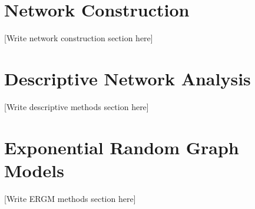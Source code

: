 
\section{Network Construction}
\label{sec:method_network}


[Write network construction section here]

\section{Descriptive Network Analysis}
\label{sec:method_descriptive}


[Write descriptive methods section here]

\section{Exponential Random Graph Models}
\label{sec:method_ergm}


[Write ERGM methods section here]
